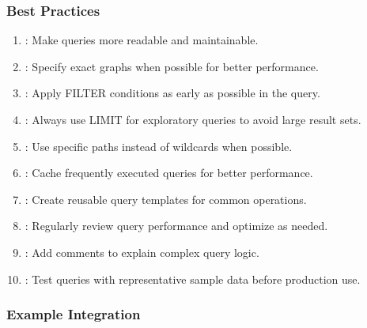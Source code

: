 \documentclass[letterpaper,10pt,english]{sphinxmanual}
\begin{document}
\subsubsection{Best Practices}
\label{\detokenize{api/sparql-api:best-practices}}\begin{enumerate}
%
\item {} 
\sphinxAtStartPar
{}: Make queries more readable and maintainable.

\item {} 
\sphinxAtStartPar
{}: Specify exact graphs when possible for better performance.

\item {} 
\sphinxAtStartPar
{}: Apply FILTER conditions as early as possible in the query.

\item {} 
\sphinxAtStartPar
{}: Always use LIMIT for exploratory queries to avoid large result sets.

\item {} 
\sphinxAtStartPar
{}: Use specific paths instead of wildcards when possible.

\item {} 
\sphinxAtStartPar
{}: Cache frequently executed queries for better performance.

\item {} 
\sphinxAtStartPar
{}: Create reusable query templates for common operations.

\item {} 
\sphinxAtStartPar
{}: Regularly review query performance and optimize as needed.

\item {} 
\sphinxAtStartPar
{}: Add comments to explain complex query logic.

\item {} 
\sphinxAtStartPar
{}: Test queries with representative sample data before production use.

\end{enumerate}


\subsubsection{Example Integration}
\label{\detokenize{api/sparql-api:example-integration}}
\end{document}
